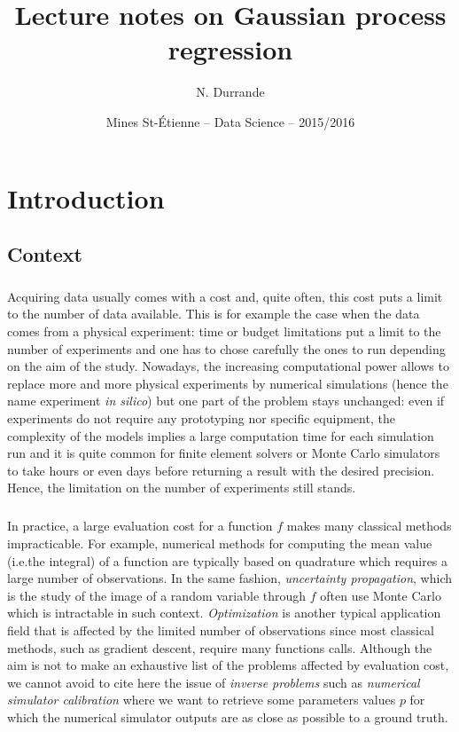 \documentclass[twoside,openright]{report}
\author{N. Durrande}
\date{Mines St-\'Etienne -- Data Science -- 2015/2016}
\title{Lecture notes on Gaussian process regression}
\begin{document}
\maketitle	


\tableofcontents

\chapter*{Introduction}

\section*{Context}

\paragraph{}
Acquiring data usually comes with a cost and, quite often, this cost puts a limit to the number of data available. This is for example the case when the data comes from a physical experiment: time or budget limitations put a limit to the number of experiments and one has to chose carefully the ones to run depending on the aim of the study. Nowadays, the increasing computational power allows to replace more and more physical experiments by numerical simulations (hence the name experiment \emph{in silico}) but one part of the problem stays unchanged: even if experiments do not require any prototyping nor specific equipment, the complexity of the models implies a large computation time for each simulation run and it is quite common for finite element solvers or Monte Carlo simulators to take hours or even days before returning a result with the desired precision. Hence, the limitation on the number of experiments still stands.

\paragraph{}
In practice, a large evaluation cost for a function $f$ makes many classical methods impracticable. For example, numerical methods for computing the mean value (i.e.\@ the integral) of a function are typically based on quadrature which requires a large number of observations. In the same fashion, \emph{uncertainty propagation}, which is the study of the image of a random variable through $f$ often use Monte Carlo which is intractable in such context. \emph{Optimization} is another typical application field that is affected by the limited number of observations since most classical methods, such as gradient descent, require many functions calls. Although the aim is not to make an exhaustive list of the problems affected by evaluation cost, we cannot avoid to cite here the issue of \emph{inverse problems} such as \emph{numerical simulator calibration} where we want to retrieve some parameters values $p$ for which the numerical simulator outputs are as close as possible to a ground truth.
\end{document}
